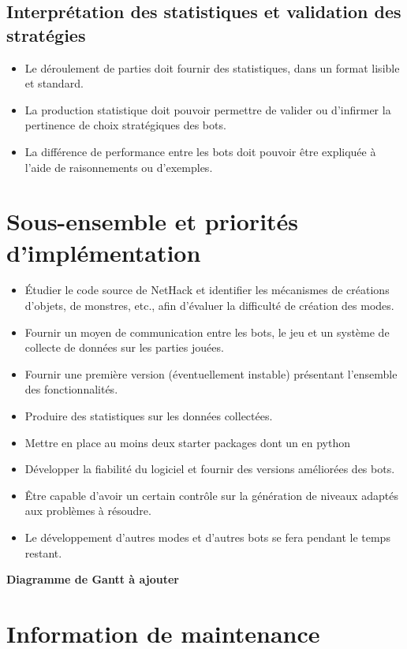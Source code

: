\documentclass[12pt]{article}
\begin{document}
\subsection{Interprétation des statistiques et validation des stratégies}

\begin{itemize}
\item Le déroulement de parties doit fournir des statistiques, dans un format lisible et standard.
\item La production statistique doit pouvoir permettre de valider ou d'infirmer la pertinence de choix stratégiques des bots.
\item La différence de performance entre les bots doit pouvoir être expliquée à l'aide de raisonnements ou d'exemples.
\end{itemize}

\section{Sous-ensemble et priorités d'implémentation}

\begin{itemize}
\item Étudier le code source de NetHack et identifier les mécanismes de créations d'objets, de monstres, etc., afin d'évaluer la difficulté de création des modes.
\item Fournir un moyen de communication entre les bots, le jeu et un système de collecte de données sur les parties jouées.
\item Fournir une première version (éventuellement instable) présentant l'ensemble des fonctionnalités.
\item Produire des statistiques sur les données collectées.
\item Mettre en place au moins deux starter packages dont un en python
\item Développer la fiabilité du logiciel et fournir des versions améliorées des bots.
\item Être capable d'avoir un certain contrôle sur la génération de niveaux adaptés aux problèmes à résoudre.
\item Le développement d'autres modes et d'autres bots se fera pendant le temps restant.
\end{itemize}

\textbf{Diagramme de Gantt à ajouter}

\section{Information de maintenance}
\end{document}
